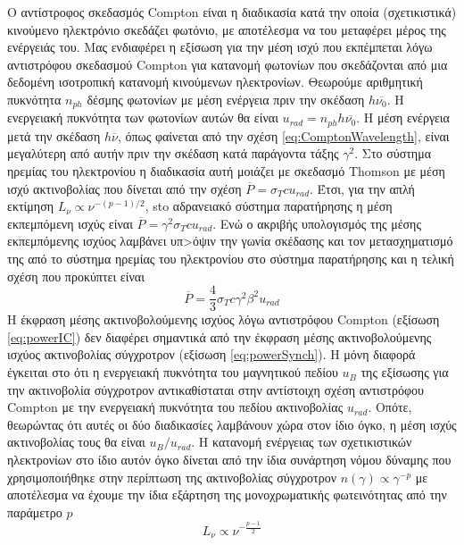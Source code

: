Ο αντίστροφος σκεδασμός \textlatin{Compton} είναι η διαδικασία κατά την οποία (σχετικιστικά) κινούμενο ηλεκτρόνιο σκεδάζει φωτόνιο, με αποτέλεσμα να του μεταφέρει μέρος της ενέργειάς του. Μας ενδιαφέρει η εξίσωση για την μέση ισχύ που εκπέμπεται λόγω αντιστρόφου σκεδασμού \textlatin{Compton} για κατανομή φωτονίων που σκεδάζονται από μια δεδομένη ισοτροπική κατανομή κινούμενων ηλεκτρονίων. Θεωρούμε αριθμητική πυκνότητα $n_{ph}$ δέσμης φωτονίων με μέση ενέργεια πριν την σκέδαση $h\overline{\nu_0}$. Η ενεργειακή πυκνότητα των φωτονίων αυτών θα είναι $u_{rad} = n_{ph} h\overline{\nu_0}$. Η μέση ενέργεια μετά την σκέδαση $h\overline{\nu}$, όπως φαίνεται από την σχέση \ref{eq:ComptonWavelength}, είναι μεγαλύτερη από αυτήν πριν την σκέδαση κατά παράγοντα τάξης $\gamma^2$. Στο σύστημα ηρεμίας του ηλεκτρονίου η διαδικασία αυτή μοιάζει με σκεδασμό \textlatin{Thomson} με μέση ισχύ ακτινοβολίας που δίνεται από την σχέση $\overline{P} = \sigma_T c u_{rad} $. Έτσι, για την απλή εκτίμηση $L_\nu \propto \nu^{-(p-1)/2}$, sto αδρανειακό σύστημα παρατήρησης η μέση εκπεμπόμενη ισχύς είναι $ \overline{P} = \gamma^2 \sigma_T c u_{rad} $. Ενώ ο ακριβής υπολογισμός της μέσης εκπεμπόμενης ισχύος λαμβάνει υπ>όψιν την γωνία σκέδασης και τον μετασχηματισμό της από το σύστημα ηρεμίας του ηλεκτρονίου στο σύστημα παρατήρησης και η τελική σχέση που προκύπτει είναι\cite{netzer_2013}
\begin{equation}
    \overline{P} = \frac{4}{3} \sigma_T c \gamma^2 \beta^2 u_{rad} \label{eq:powerIC} 
\end{equation}
Η έκφραση μέσης ακτινοβολούμενης ισχύος λόγω αντιστρόφου \textlatin{Compton} (εξίσωση \ref{eq:powerIC}) δεν διαφέρει σημαντικά από την έκφραση μέσης ακτινοβολούμενης ισχύος ακτινοβολίας σύγχροτρον (εξίσωση \ref{eq:powerSynch}). Η μόνη διαφορά έγκειται στο ότι η ενεργειακή πυκνότητα του μαγνητικού πεδίου $u_B$ της εξίσωσης για την ακτινοβολία σύγχροτρον αντικαθίσταται στην αντίστοιχη σχέση αντιστρόφου \textlatin{Compton} με την ενεργειακή πυκνότητα του πεδίου ακτινοβολίας $u_{rad}$. Οπότε, θεωρώντας ότι αυτές οι δύο διαδικασίες λαμβάνουν χώρα στον ίδιο όγκο, η μέση ισχύς ακτινοβολίας τους θα είναι $u_B/u_{rad}$. Η κατανομή ενέργειας των σχετικιστικών ηλεκτρονίων στο ίδιο αυτόν όγκο δίνεται από την ίδια συνάρτηση νόμου δύναμης που χρησιμοποιήθηκε στην περίπτωση της ακτινοβολίας σύγχροτρον $n(\gamma) \propto \gamma^{-p}$ με αποτέλεσμα να έχουμε την ίδια εξάρτηση της μονοχρωματικής φωτεινότητας από την παράμετρο $p$\cite{netzer_2013} 
\begin{equation}
    L_\nu \propto \nu^{-\frac{p-1}{2}} \label{eq:LumiIC} 
\end{equation}

